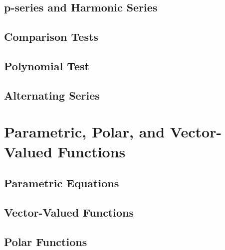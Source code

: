 \documentclass[letterpaper]{report}
\begin{document}
\section{p-series and Harmonic Series}
\section{Comparison Tests}
\section{Polynomial Test}
\section{Alternating Series}

\chapter{Parametric, Polar, and Vector-Valued Functions}
\section{Parametric Equations}
\section{Vector-Valued Functions}
\section{Polar Functions}
\end{document}
